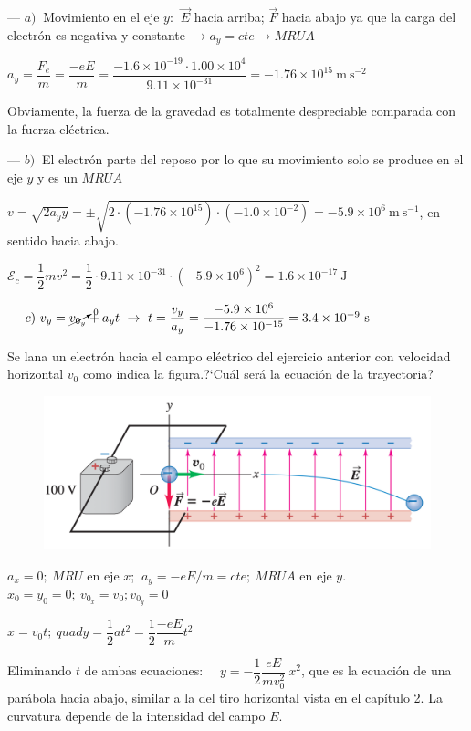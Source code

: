 --- $a)\ $ Movimiento en el eje $y$: $\ \vec E$ hacia arriba; $\vec F$ hacia abajo ya que la carga del electrón es negativa y constante $\to a_y=cte \to MRUA$

$a_y=\dfrac{F_e}{m}=\dfrac{-eE}{m}=\dfrac{-1.6\times 10^{-19} \cdot 1.00\times 10^{4}}{9.11\times 10^{-31}}=-1.76\times 10^{15}\ \mathrm{m\ s}^{-2}$

Obviamente, la fuerza de la gravedad es totalmente despreciable comparada con la fuerza eléctrica.

--- $b)\ $ El electrón parte del reposo por lo que su movimiento solo se produce en el eje $y$ y es un $MRUA$

$v=\sqrt{2a_y y}=\pm \sqrt{2\cdot (-1.76\times 10^{15}) \cdot (-1.0 \times 10^{-2})}=- 5.9\times 10^6 \ \mathrm{m\ s}^{-1}$, en sentido hacia abajo.

$\mathcal E_c=\dfrac 1 2 m v^2=\dfrac 1 2  \cdot 9.11\times 10^{-31} \cdot (-5.9 \times 10^6)^2 =1.6\times 10^{-17}\ \mathrm{J}$

--- $c)\ v_y=\cancelto{0}{v_{0_y}} +a_y t \  \to \ t=\dfrac{v_y}{a_y}=\dfrac{-5.9\times 10^6}{-1.76\times 10^{-15}}=3.4\times 10^{-9}\ \mathrm{s}$

\begin{prob}
Se lana un electrón hacia el campo eléctrico del ejercicio anterior con velocidad horizontal $v_0$ como indica la figura.?`Cuál será la ecuación de la trayectoria?	
\begin{figure}[H]
	\centering
	\includegraphics[width=.9\textwidth]{imagenes/imagenes22/T22IM20.png}
\end{figure}
\end{prob}

$a_x=0;\ MRU$ en eje $x$;  $\ a_y=-eE/m=cte;\ MRUA$ en eje $y$. $x_0=y_0=0;\ v_{0_x}=v_0; v_{0_y}=0$

$x=v_0t;\ quad y=\dfrac 1 2 a t^2=\dfrac 1 2 \dfrac{-eE}{m} t^2$

Eliminando $t$ de ambas ecuaciones: $\quad y=-\dfrac 1 2 \dfrac{eE}{mv_0^2}\ x^2$, que es la ecuación de una parábola hacia abajo, similar a la del tiro horizontal vista en el capítulo 2. La curvatura depende de la intensidad del campo $E$.

